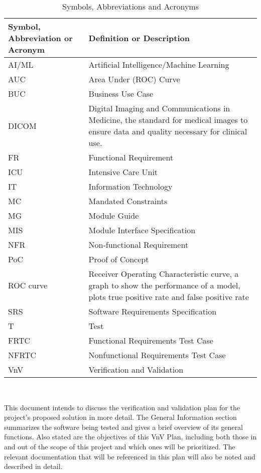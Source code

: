 \documentclass[12pt, titlepage]{article}
\begin{document}
\renewcommand{\arraystretch}{1.2}
\begin{table}[H]
    \centering
    \label{tab:symbsAbbrevsAcros}
    \begin{tabular}{p{1.25in}p{3.75in}}
        \toprule
        \textbf{Symbol, Abbreviation or Acronym} & \textbf{Definition or Description} \\
        \midrule
        AI/ML & Artificial Intelligence/Machine Learning \\
        AUC & Area Under (ROC) Curve \\
        BUC & Business Use Case \\
        DICOM & Digital Imaging and Communications in Medicine, the standard for medical images to ensure data and quality necessary for clinical use.\\
        FR & Functional Requirement \\
        ICU & Intensive Care Unit \\
        IT & Information Technology \\
        MC & Mandated Constraints \\
        MG & Module Guide \\
        MIS & Module Interface Specification \\
        NFR & Non-functional Requirement \\
        PoC & Proof of Concept\\
        ROC curve & Receiver Operating Characteristic curve, a graph to show the performance of a model, plots true positive rate and false positive rate \\
        SRS & Software Requirements Specification \\
        T & Test \\
        FRTC & Functional Requirements Test Case \\
        NFRTC & Nonfunctional Requirements Test Case \\
        VnV & Verification and Validation \\
        \bottomrule
    \end{tabular}\\
    \caption{Symbols, Abbreviations and Acronyms}
\end{table}

\newpage


\noindent This document intends to discuss the verification and validation plan for the project's proposed solution in more detail. The General Information section summarizes the software being tested and gives a brief overview of its general functions. Also stated are the objectives of this VnV Plan, including both those in and out of the scope of this project and which ones will be prioritized. The relevant documentation that will be referenced in this plan will also be noted and described in detail.
\end{document}
